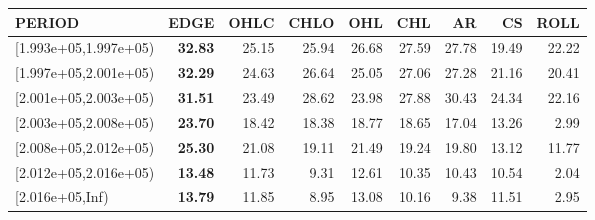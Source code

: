 \begin{table}[ht]
\centering
\begin{tabular}{lrrrrrrrr}
  \hline
PERIOD & EDGE & OHLC & CHLO & OHL & CHL & AR & CS & ROLL \\ 
  \hline
[1.993e+05,1.997e+05) & \textbf{32.83} & 25.15 & 25.94 & 26.68 & 27.59 & 27.78 & 19.49 & 22.22 \\ 
  [1.997e+05,2.001e+05) & \textbf{32.29} & 24.63 & 26.64 & 25.05 & 27.06 & 27.28 & 21.16 & 20.41 \\ 
  [2.001e+05,2.003e+05) & \textbf{31.51} & 23.49 & 28.62 & 23.98 & 27.88 & 30.43 & 24.34 & 22.16 \\ 
  [2.003e+05,2.008e+05) & \textbf{23.70} & 18.42 & 18.38 & 18.77 & 18.65 & 17.04 & 13.26 & 2.99 \\ 
  [2.008e+05,2.012e+05) & \textbf{25.30} & 21.08 & 19.11 & 21.49 & 19.24 & 19.80 & 13.12 & 11.77 \\ 
  [2.012e+05,2.016e+05) & \textbf{13.48} & 11.73 & 9.31 & 12.61 & 10.35 & 10.43 & 10.54 & 2.04 \\ 
  [2.016e+05,Inf) & \textbf{13.79} & 11.85 & 8.95 & 13.08 & 10.16 & 9.38 & 11.51 & 2.95 \\ 
   \hline
\end{tabular}
\end{table}
